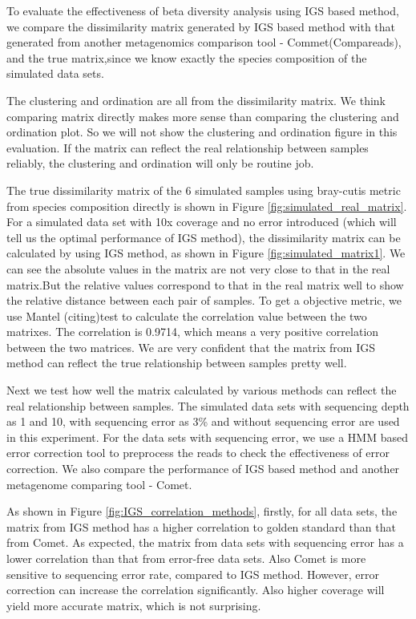 \documentclass{article}
\begin{document}
To evaluate the effectiveness of beta diversity analysis using IGS based method, we compare the dissimilarity matrix generated by IGS based method with that generated from another metagenomics comparison tool - Commet(Compareads), and the true matrix,since we know exactly the species composition of the simulated data sets.

The clustering and ordination are all from the dissimilarity matrix. We think comparing matrix directly makes more sense than comparing the clustering and ordination plot. So we will not show the clustering and ordination figure in this evaluation. If the matrix can reflect the real relationship between samples reliably, the clustering and ordination will only be routine job.

The true dissimilarity matrix of the 6 simulated samples using bray-cutis metric from species composition directly is shown in Figure \ref{fig:simulated_real_matrix}.
For a simulated data set with 10x coverage and no error introduced (which will tell us the optimal performance of IGS method), the dissimilarity matrix can be calculated by using IGS method, as shown in Figure \ref{fig:simulated_matrix1}. We can see the absolute values in the matrix are not very close to that in the real matrix.But the relative values correspond to that in the real matrix well to show the relative distance between each pair of samples. To get a objective metric, we use 
Mantel (citing)test to calculate the correlation value between the two matrixes. The correlation is 0.9714, which means a very positive correlation between the two matrices. We are very confident that the matrix from IGS method can reflect the true relationship between samples pretty well.

Next we test how well the matrix calculated by various methods can reflect the real relationship between samples. 
The simulated data sets with sequencing depth as 1 and 10, with sequencing error as 3\% and without sequencing error are used in this experiment.
For the data sets with sequencing error, we use a HMM based error correction tool to preprocess the reads to check the effectiveness 
of error correction. We also  compare the performance of IGS based method and another metagenome comparing tool - Comet. 

As shown in Figure \ref{fig:IGS_correlation_methods}, firstly, for all data sets, the matrix from IGS method has a higher 
correlation to golden standard than that from Comet.  As expected, the matrix from data sets with sequencing error has a lower correlation than that from error-free
data sets. Also Comet is more sensitive to sequencing error rate, compared to IGS method.
However, error correction can increase the correlation significantly. Also higher coverage will yield more accurate matrix, which is not surprising.
\end{document}

